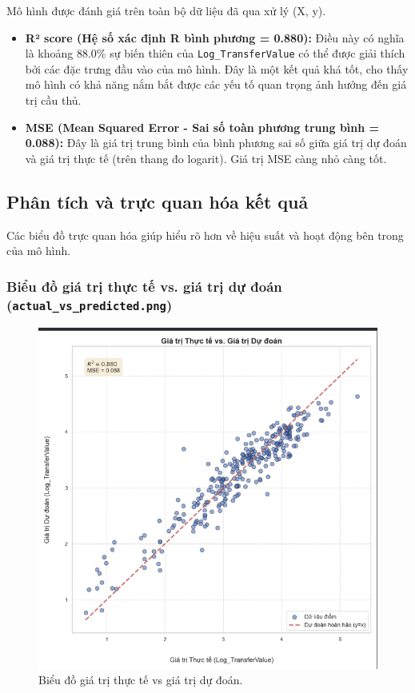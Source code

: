 \documentclass[12pt, a4paper]{report}
\begin{document}
Mô hình được đánh giá trên toàn bộ dữ liệu đã qua xử lý (X, y).
\begin{itemize}
    \item \textbf{R² score (Hệ số xác định R bình phương = 0.880):} Điều này có nghĩa là khoảng 88.0\% sự biến thiên của \texttt{Log\_TransferValue} có thể được giải thích bởi các đặc trưng đầu vào của mô hình. Đây là một kết quả khá tốt, cho thấy mô hình có khả năng nắm bắt được các yếu tố quan trọng ảnh hưởng đến giá trị cầu thủ.
    \item \textbf{MSE (Mean Squared Error - Sai số toàn phương trung bình = 0.088):} Đây là giá trị trung bình của bình phương sai số giữa giá trị dự đoán và giá trị thực tế (trên thang đo logarit). Giá trị MSE càng nhỏ càng tốt.
\end{itemize}

\subsection{Phân tích và trực quan hóa kết quả}

Các biểu đồ trực quan hóa giúp hiểu rõ hơn về hiệu suất và hoạt động bên trong của mô hình.

\subsubsection*{Biểu đồ giá trị thực tế vs. giá trị dự đoán (\texttt{actual\_vs\_predicted.png})}
\begin{figure}[H]
    \centering
    \includegraphics[width=\textwidth]{actual_vs_predicted.png}
    \caption{Biểu đồ giá trị thực tế vs giá trị dự đoán.}
    \label{fig:actual_vs_predicted}
\end{figure}
\end{document}

